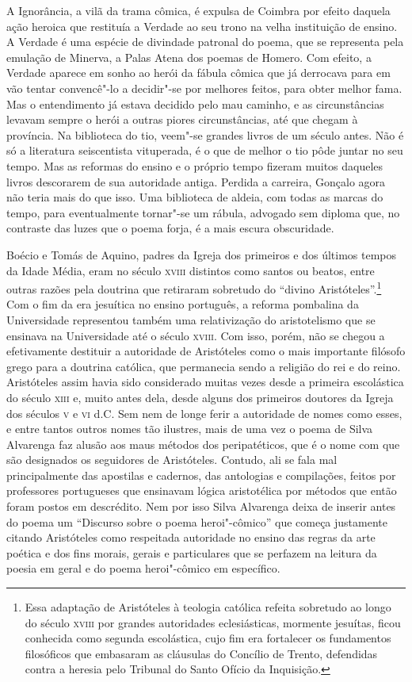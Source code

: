 A Ignorância, a vilã da trama cômica, é expulsa de Coimbra por efeito daquela
ação heroica que restituía a Verdade ao seu trono na velha instituição de
ensino.  A Verdade é uma espécie de divindade patronal do poema, que se
representa pela emulação de Minerva, a Palas Atena dos poemas de Homero.  Com
efeito, a Verdade aparece em sonho ao herói da fábula cômica que já derrocava
para em vão tentar convencê"-lo a decidir"-se por melhores feitos, para obter
melhor fama. Mas o entendimento já estava decidido pelo mau caminho, e as
circunstâncias levavam sempre o herói a outras piores circunstâncias, até que
chegam à província. Na biblioteca do tio, veem"-se grandes livros de um século
antes. Não é só a literatura seiscentista vituperada, é o que de melhor o tio
pôde juntar no seu tempo. Mas as reformas do ensino e o próprio tempo fizeram
muitos daqueles livros descorarem de sua autoridade antiga. Perdida a carreira,
Gonçalo agora não teria mais do que isso. Uma biblioteca de aldeia, com todas as
marcas do tempo, para eventualmente tornar"-se um rábula, advogado sem diploma
que, no contraste das luzes que o poema forja, é a mais escura obscuridade.

Boécio e Tomás de Aquino, padres da Igreja dos primeiros e dos últimos tempos da
Idade Média, eram no século \textsc{xviii} distintos como santos ou beatos, entre
outras razões pela doutrina que retiraram sobretudo do ``divino
Aristóteles''.\footnote{ Essa adaptação de Aristóteles à teologia católica
refeita sobretudo ao longo do século \textsc{xviii} por grandes autoridades
eclesiásticas, mormente jesuítas, ficou conhecida como segunda escolástica, cujo
fim era fortalecer os fundamentos filosóficos que embasaram as cláusulas do
Concílio de Trento, defendidas contra a heresia pelo Tribunal do Santo Ofício da
Inquisição.} Com o fim da era jesuítica no ensino português, a reforma pombalina
da Universidade representou também uma relativização do aristotelismo que se
ensinava na Universidade até o século \textsc{xviii}. Com isso, porém, não se
chegou a efetivamente destituir a autoridade de Aristóteles como o mais
importante filósofo grego para a doutrina católica, que permanecia sendo a
religião do rei e do reino. Aristóteles assim havia sido considerado muitas
vezes desde a primeira escolástica do século \textsc{xiii} e, muito antes dela,
desde alguns dos primeiros doutores da Igreja dos séculos \textsc{v} e
\textsc{vi} d.C.  Sem nem de longe ferir a autoridade de nomes como esses, e
entre tantos outros nomes tão ilustres, mais de uma vez o poema de Silva
Alvarenga faz alusão aos maus métodos dos peripatéticos, que é o nome com que
são designados os seguidores de Aristóteles. Contudo, ali se fala mal
principalmente das apostilas e cadernos, das antologias e compilações, feitos
por professores portugueses que ensinavam lógica aristotélica por métodos que
então foram postos em descrédito.  Nem por isso Silva Alvarenga deixa de inserir
antes do poema um ``Discurso sobre o poema heroi"-cômico'' que começa justamente
citando Aristóteles como respeitada autoridade no ensino das regras da arte
poética e dos fins morais, gerais e particulares que se perfazem na leitura da
poesia em geral e do poema heroi"-cômico em específico.

